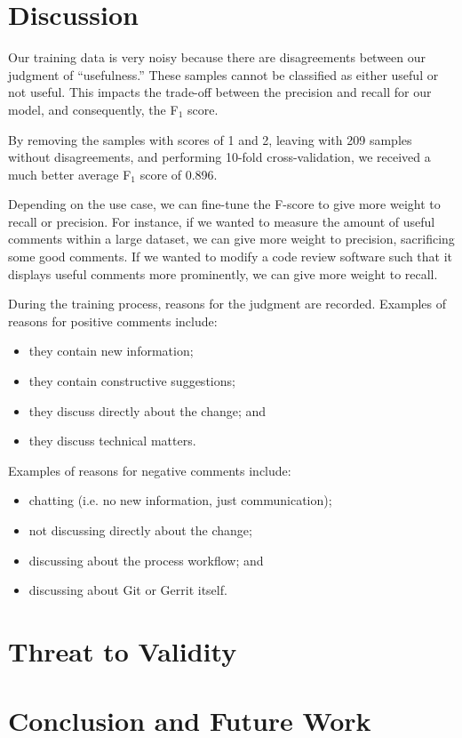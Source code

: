 \documentclass[conference]{IEEEtran}
\begin{document}





\section{Discussion}

Our training data is very noisy because there are disagreements between our judgment of ``usefulness.''
These samples cannot be classified as either useful or not useful.
This impacts the trade-off between the precision and recall for our model, and consequently, the F$_1$ score.

By removing the samples with scores of 1 and 2, leaving with 209 samples without disagreements, and performing 10-fold cross-validation, we received a much better average F$_1$ score of 0.896.


Depending on the use case, we can fine-tune the F-score to give more weight to recall or precision.
For instance, if we wanted to measure the amount of useful comments within a large dataset, we can give more weight to precision, sacrificing some good comments.
If we wanted to modify a code review software such that it displays useful comments more prominently, we can give more weight to recall.


During the training process, reasons for the judgment are recorded. Examples of reasons for positive comments include:

\begin{itemize}
	\item they contain new information;
	\item they contain constructive suggestions;
	\item they discuss directly about the change; and
	\item they discuss technical matters.
\end{itemize}

Examples of reasons for negative comments include:

\begin{itemize}
	\item chatting (i.e. no new information, just communication);
	\item not discussing directly about the change;
	\item discussing about the process workflow; and
	\item discussing about Git or Gerrit itself.
\end{itemize}






\section{Threat to Validity}


\section{Conclusion and Future Work}


\IEEEpeerreviewmaketitle







\end{document}
